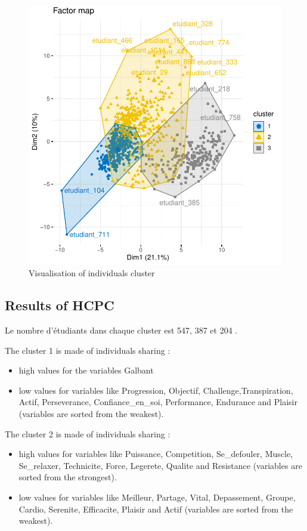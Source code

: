 \documentclass[12pt]{article}
\begin{document}
\begin{figure}[H]
\begin{center}
\includegraphics[scale=1.]{HCPC_2.pdf} 
\caption[]{Visualisation of  individuals cluster }
\end{center}
\end{figure}


\subsection{Results of HCPC}

Le nombre d'étudiants dans chaque cluster est  547, 387 et 204 .

The cluster 1 is made of individuals sharing :
\begin{itemize}
    \item  high values for the variables Galbant
    
    \item  low values for variables like Progression, Objectif, Challenge,Transpiration, Actif, Perseverance, Confiance\_en\_soi, Performance, Endurance and Plaisir (variables are sorted from the weakest).
\end{itemize}

The cluster 2 is made of individuals sharing :
\begin{itemize}
    \item  high values for variables like Puissance, Competition, Se\_defouler, Muscle, Se\_relaxer, Technicite, Force, Legerete, Qualite and Resistance (variables are sorted from the strongest).
    
    \item  low values for variables like Meilleur, Partage, Vital, Depassement, Groupe, Cardio, Serenite, Efficacite, Plaisir and Actif (variables are sorted from the weakest).
\end{itemize}
\end{document}
